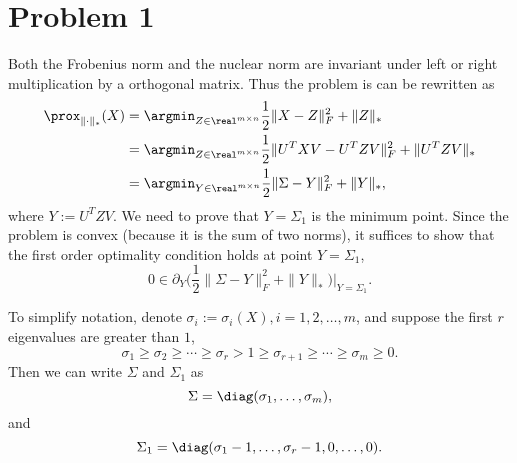 \section{Problem 1}

Both the Frobenius norm and the nuclear norm are invariant
under left or right multiplication by a orthogonal matrix.
Thus the problem is can be rewritten as
\begin{equation}
\begin{split}
    \prox_{\|\cdot\|_*}(X)
        &= \argmin_{Z\in\real^{m\times n}}\frac{1}{2}\|X-Z\|_F^2+\|Z\|_* \\
        &= \argmin_{Z\in\real^{m\times n}}\frac{1}{2}\|U^TXV-U^TZV\|_F^2+\|U^TZV\|_* \\
        &= \argmin_{Y\in\real^{m\times n}}\frac{1}{2}\|\Sigma-Y\|_F^2+\|Y\|_*, \\
\end{split}
\end{equation}
where $Y:=U^TZV$.
We need to prove that $Y=\Sigma_1$ is the minimum point.
Since the problem is convex (because it is the sum of two norms),
it suffices to show that the first order optimality condition holds
at point $Y=\Sigma_1$,
\begin{equation}
    0\in \partial_Y\bigg(\frac{1}{2}\|\Sigma-Y\|_F^2+\|Y\|_*\bigg)\bigg|_{Y=\Sigma_1}.
\end{equation}

To simplify notation,
denote $\sigma_i:=\sigma_i(X), i=1,2,\dots,m$,
and suppose the first $r$ eigenvalues are greater than $1$,
\ie
\begin{equation}
    \sigma_1\ge\sigma_2\ge\cdots\ge\sigma_r>1\ge\sigma_{r+1}\ge\cdots\ge\sigma_m\ge0.
\end{equation}
Then we can write $\Sigma$ and $\Sigma_1$ as
\begin{equation}
    \Sigma=\diag(\sigma_1,\dots,\sigma_m),
\end{equation}
and
\begin{equation}
    \Sigma_1=\diag(\sigma_1-1,\dots,\sigma_r-1,0,\dots,0).
\end{equation}

